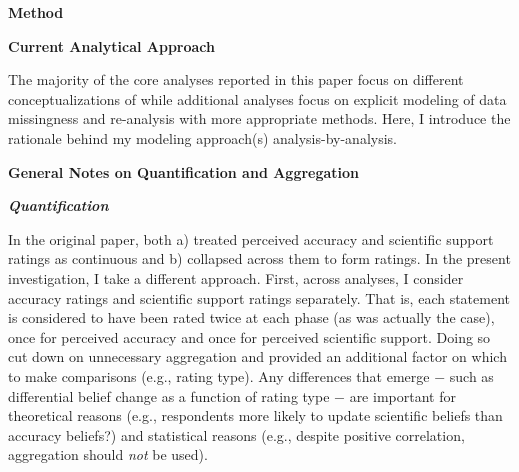 \documentclass[12pt]{article}  %
\begin{document}
\begin{center}
    \textbf{Method} %
\end{center}

\noindent\textbf{Current Analytical Approach}

The majority of the core analyses reported in this paper focus on different conceptualizations of  while additional analyses focus on explicit modeling of data missingness and re-analysis with more appropriate methods. Here, I introduce the rationale behind my modeling approach(s) analysis-by-analysis.

\noindent\textbf{General Notes on Quantification and Aggregation}

\noindent\textbf{\textit{ Quantification}}

In the original paper, \textcite{vlasceanu_synchronization_2020} both a) treated perceived accuracy and scientific support ratings as continuous and b) collapsed across them to form  ratings. In the present investigation, I take a different approach. First, across analyses, I consider accuracy ratings and scientific support ratings separately. That is, each statement is considered to have been rated twice at each phase (as was actually the case), once for perceived accuracy and once for perceived scientific support. Doing so cut down on unnecessary aggregation and provided an additional factor on which to make comparisons (e.g., rating type). Any differences that emerge $-$ such as differential belief change as a function of rating type $-$ are important for theoretical reasons (e.g., respondents more likely to update scientific beliefs than accuracy beliefs?) and statistical reasons (e.g., despite positive correlation, aggregation should \textit{not} be used).
\end{document}
